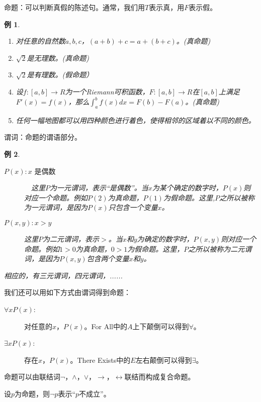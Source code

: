 \documentclass{article}
\newtheorem*{Example}{例}
\begin{document}
\begin{CJK}{UTF8}{gbsn}
  命题：可以判断真假的陈述句。通常，我们用$T$表示真，用$F$表示假。
  \begin{Example}\quad
    
    \begin{enumerate}
    \item 对任意的自然数$a,b,c$，$(a + b) + c = a + (b + c)$。(真命题)
    \item $\sqrt{2}$是无理数。(真命题)
    \item $\sqrt{2}$是有理数。(假命题）
    \item 设$f:[a,b] \to R$为一个Riemann可积函数，$F:[a,b] \to R$在$[a,b]$上满足$F'(x)=f(x)$，那么$\int_{a}^{b}f(x)dx = F(b) - F(a)$。(真命题)
    \item 任何一幅地图都可以用四种颜色进行着色，使得相邻的区域着以不同的颜色。
    \end{enumerate}
  \end{Example}
  谓词：命题的谓语部分。
  
  \begin{Example}\quad
    
    \begin{description}
    \item     [$P(x): x$ 是偶数]　这里$P$为一元谓词，表示“是偶数”。当$x$为某个确定的数字时，$P(x)$则对应一个命题。例如$P(2)$为真命题，$P(1)$为假命题。这里,$P$之所以被称为一元谓词，是因为$P(x)$只包含一个变量$x$。
    \item     [$P(x,y): x >y$]  这里$P$为二元谓词，表示$>$。当$x$和$y$为确定的数字时，$P(x,y)$则对应一个命题。例如$1>0$为真命题，$0>1$为假命题。这里，$P$之所以被称为二元谓词，是因为$P(x,y)$包含两个变量$x$和$y$。
    \end{description}
相应的，有三元谓词，四元谓词，......
\end{Example}

我们还可以用如下方式由谓词得到命题：

\begin{description}
\item [$\forall x P(x)$:] 对任意的$x$，$P(x)$。For All中的$A$上下颠倒可以得到$\forall$。
\item [$\exists x P(x)$:] 存在$x$，$P(x)$。There Exists中的$E$左右颠倒可以得到$\exists$。
\end{description}

命题可以由联结词$\lnot$，$\land$，$\lor$，$\to$，$\leftrightarrow$联结而构成复合命题。

设$p$为命题，则$\lnot p$表示“$p$不成立”。


\end{CJK}
\end{document}
